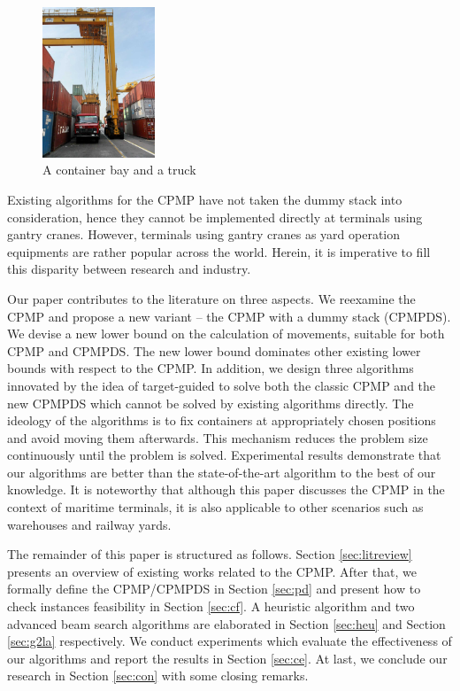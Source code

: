 \documentclass[review,3p,times,authoryear,12pt]{elsarticle}
\begin{document}
\begin{figure}[htbp]
\centering
\includegraphics[width=0.3\textwidth]{fig2.jpg}
\caption{A container bay and a truck}
\label{fig:2}
\end{figure}

Existing algorithms for the CPMP have not taken the dummy stack into consideration, hence they cannot be implemented directly at terminals using gantry cranes. However, terminals using gantry cranes as yard operation equipments are rather popular across the world. Herein, it is imperative to fill this disparity between research and industry.

Our paper contributes to the literature on three aspects. We reexamine the CPMP and propose a new variant -- the CPMP with a dummy stack (CPMPDS). We devise a new lower bound on the calculation of movements, suitable for both CPMP and CPMPDS. The new lower bound dominates other existing lower bounds with respect to the CPMP. In addition, we design three algorithms innovated by the idea of target-guided to solve both the classic CPMP and the new CPMPDS which cannot be solved by existing algorithms directly. The ideology of the algorithms is to fix containers at appropriately chosen positions and avoid moving them afterwards. This mechanism reduces the problem size continuously until the problem is solved. Experimental results demonstrate that our algorithms are better than the state-of-the-art algorithm to the best of our knowledge. It is noteworthy that although this paper discusses the CPMP in the context of maritime terminals, it is also applicable to other scenarios such as warehouses and railway yards.

The remainder of this paper is structured as follows. Section \ref{sec:litreview} presents an overview of existing works related to the CPMP. After that, we formally define the CPMP/CPMPDS in Section \ref{sec:pd} and present how to check instances feasibility in Section \ref{sec:cf}. A heuristic algorithm and two advanced beam search algorithms are elaborated in Section \ref{sec:heu} and Section \ref{sec:g2la} respectively. We conduct experiments which evaluate the effectiveness of our algorithms and report the results in Section \ref{sec:ce}. At last, we conclude our research in Section \ref{sec:con} with some closing remarks.
\end{document}
